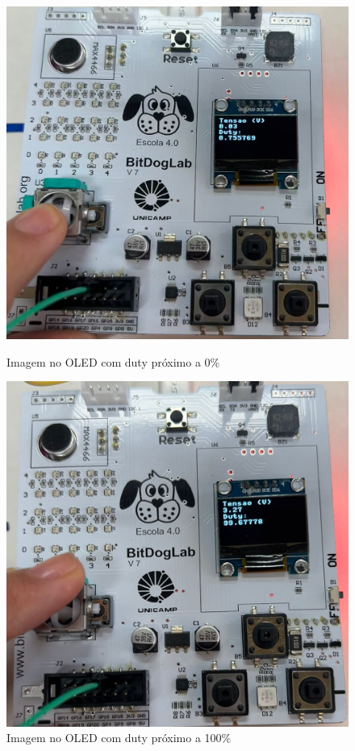 \documentclass{article}
\begin{document}
\begin{figure}[H]
    \centering
    \begin{minipage}{0.45\linewidth}
        \centering
        \includegraphics[width=\linewidth]{foto1.jpeg}
        \caption{Imagem no OLED com duty próximo a 0\%}
        \label{fig:foto1}
    \end{minipage}
    \hfill
    \begin{minipage}{0.45\linewidth}
        \centering
        \includegraphics[width=\linewidth]{foto2.jpeg}
        \caption{Imagem no OLED com duty próximo a 100\%}
        \label{fig:foto2}
    \end{minipage}
\end{figure}
\end{document}
